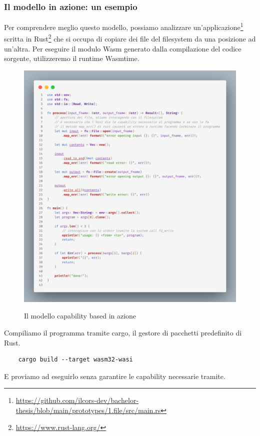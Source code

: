 \subsubsection{Il modello in azione: un esempio}
Per comprendere meglio questo modello, possiamo analizzare
un'applicazione\footnote{\url{https://github.com/ilcors-dev/bachelor-thesis/blob/main/prototypes/1.file/src/main.rs}}
scritta in Rust\footnote{\url{https://www.rust-lang.org/}} che si occupa di copiare dei file del filesystem da una
posizione ad un'altra. Per eseguire il modulo Wasm generato dalla compilazione del codice sorgente, utilizzeremo il
runtime Wasmtime.
\begin{figure}[h]
    \centering
    \captionsetup{justification=centering}
    \includegraphics[width=15cm]{./chapters/2.wasi-in-depth/images/5.wasi_capability_example.png}
    \label{wasi_capabilities_example}
    \caption{Il modello capability based in azione}
\end{figure}
Compiliamo il programma tramite cargo, il gestore di pacchetti predefinito di Rust.
\begin{lstlisting}
    cargo build --target wasm32-wasi
\end{lstlisting}

E proviamo ad eseguirlo senza garantire le capability necessarie tramite.

